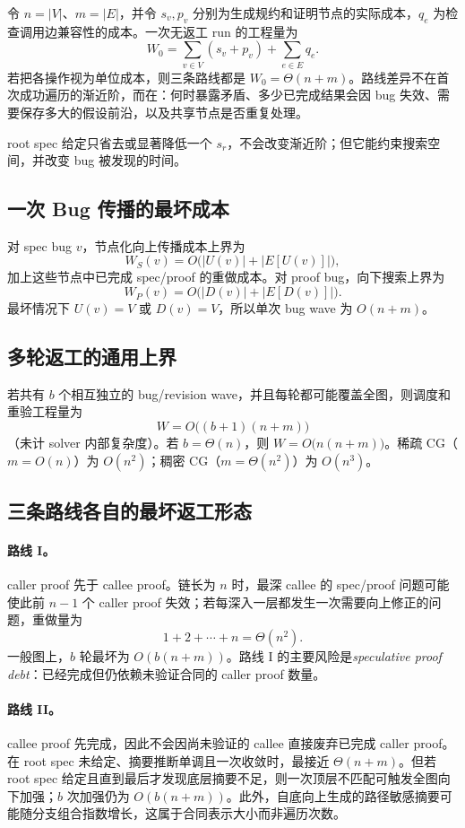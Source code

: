 \documentclass[UTF8,a4paper,11pt]{ctexart}
\begin{document}
令 $n=|V|$、$m=|E|$，并令 $s_v,p_v$ 分别为生成规约和证明节点的实际成本，$q_e$ 为检查调用边兼容性的成本。一次无返工 run 的工程量为
\[
  W_0=\sum_{v\in V}(s_v+p_v)+\sum_{e\in E}q_e.
\]
若把各操作视为单位成本，则三条路线都是 $W_0=\Theta(n+m)$。路线差异不在首次成功遍历的渐近阶，而在：何时暴露矛盾、多少已完成结果会因 bug 失效、需要保存多大的假设前沿，以及共享节点是否重复处理。

root spec 给定只省去或显著降低一个 $s_r$，不会改变渐近阶；但它能约束搜索空间，并改变 bug 被发现的时间。

\subsection{一次 Bug 传播的最坏成本}

对 spec bug $v$，节点化向上传播成本上界为
\[
  W_S(v)=O\bigl(|U(v)|+|E[U(v)]|\bigr),
\]
加上这些节点中已完成 spec/proof 的重做成本。对 proof bug，向下搜索上界为
\[
  W_P(v)=O\bigl(|D(v)|+|E[D(v)]|\bigr).
\]
最坏情况下 $U(v)=V$ 或 $D(v)=V$，所以单次 bug wave 为 $O(n+m)$。

\subsection{多轮返工的通用上界}

若共有 $b$ 个相互独立的 bug/revision wave，并且每轮都可能覆盖全图，则调度和重验工程量为
\[
  W=O\bigl((b+1)(n+m)\bigr)
\]
（未计 solver 内部复杂度）。若 $b=\Theta(n)$，则 $W=O\bigl(n(n+m)\bigr)$。稀疏 CG（$m=O(n)$）为 $O(n^2)$；稠密 CG（$m=\Theta(n^2)$）为 $O(n^3)$。

\subsection{三条路线各自的最坏返工形态}

\paragraph{路线 I。}
caller proof 先于 callee proof。链长为 $n$ 时，最深 callee 的 spec/proof 问题可能使此前 $n-1$ 个 caller proof 失效；若每深入一层都发生一次需要向上修正的问题，重做量为
\[
  1+2+\cdots+n=\Theta(n^2).
\]
一般图上，$b$ 轮最坏为 $O(b(n+m))$。路线 I 的主要风险是\emph{speculative proof debt}：已经完成但仍依赖未验证合同的 caller proof 数量。

\paragraph{路线 II。}
callee proof 先完成，因此不会因尚未验证的 callee 直接废弃已完成 caller proof。在 root spec 未给定、摘要推断单调且一次收敛时，最接近 $\Theta(n+m)$。但若 root spec 给定且直到最后才发现底层摘要不足，则一次顶层不匹配可触发全图向下加强；$b$ 次加强仍为 $O(b(n+m))$。此外，自底向上生成的路径敏感摘要可能随分支组合指数增长，这属于合同表示大小而非遍历次数。
\end{document}
